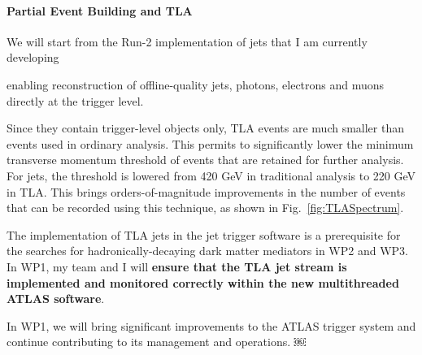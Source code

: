 





\paragraph{Partial Event Building and TLA}


We will start from the Run-2 implementation of jets that I am currently developing 



enabling reconstruction of offline-quality jets, photons, electrons and muons directly at the trigger level. 
 
Since they contain trigger-level objects only, TLA events are much smaller than events used in ordinary analysis. This permits to significantly lower the minimum transverse momentum threshold of events that are retained for further analysis. For jets, the threshold is lowered from 420 GeV in traditional analysis to 220 GeV in TLA. This brings orders-of-magnitude improvements in the number of events that can be recorded using this technique, as shown in Fig.~\ref{fig:TLASpectrum}. %

The implementation of TLA jets in the jet trigger software is a prerequisite for the searches for hadronically-decaying dark matter mediators in WP2 and WP3. In WP1, my team and I will \textbf{ensure that the TLA jet stream is implemented and monitored correctly within the new multithreaded ATLAS software}. 





In WP1, we will bring significant improvements to the ATLAS trigger system and continue contributing to its management and operations. 
￼
